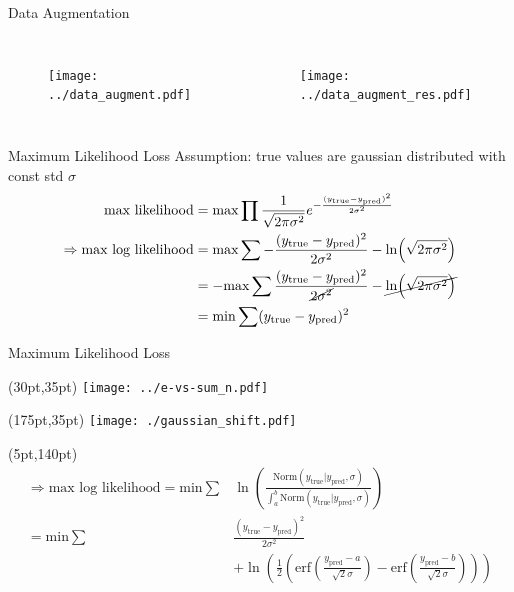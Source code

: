 \documentclass[10pt]{beamer}
\begin{document}
\begin{frame}{Data Augmentation}
  \begin{columns}
    \begin{figure}[htp]
      \texttt{[image: ../data\_augment.pdf]}
    \end{figure}
    \begin{figure}[htp]
      \texttt{[image: ../data\_augment\_res.pdf]}
    \end{figure}
  \end{columns}
\end{frame}

\begin{frame}{Maximum Likelihood Loss}
Assumption: true values are gaussian distributed with const std $\sigma$
  \begin{align*}
    \text{max likelihood} &= \text{max} \prod \frac{1}{\sqrt{2\pi \sigma^2}} e^{-\frac{(y_{\text{true}}-y_{\text{pred}})^2}{2 \sigma^2}}                          \\
    \Rightarrow \text{max log likelihood} & =\text{max} \sum -\frac{(y_{\text{true}}-y_{\text{pred}})^2}{2 \sigma^2} - \ln(\sqrt{2\pi \sigma^2})                  \\
                                          & =-\text{max} \sum\frac{(y_{\text{true}}-y_{\text{pred}})^2}{\cancel{2 \sigma^2}} - \cancel{\ln(\sqrt{2\pi \sigma^2})} \\
                                          & = \text{min} \sum (y_{\text{true}}-y_{\text{pred}})^2
  \end{align*}
\end{frame}

\begin{frame}{Maximum Likelihood Loss}
  \begin{textblock*}{150pt}(30pt,35pt)
      \texttt{[image: ../e-vs-sum\_n.pdf]}
  \end{textblock*}
  \begin{textblock*}{150pt}(175pt,35pt)
    \texttt{[image: ./gaussian\_shift.pdf]}
  \end{textblock*}

  \begin{textblock*}{150pt}(5pt,140pt)
    \begin{align*}
      \Rightarrow \text{max log likelihood} = \text{min} \sum& \ln(\frac{\text{Norm}(y_{\text{true}} | y_{\text{pred}}, \sigma)}{\int^b_a \text{Norm}(y_{\text{true}} | y_{\text{pred}}, \sigma)})\\
                                            =\text{min} \sum& \frac{(y_{\text{true}}-y_{\text{pred}})^2}{2 \sigma^2}\\
   &+\ln(\frac{1}{2} \left(\text{erf}(\frac{y_{\text{pred}}-a}{\sqrt{2}\sigma}) - \text{erf}(\frac{y_{\text{pred}}-b}{\sqrt{2}\sigma})\right))
    \end{align*}
  \end{textblock*}
\end{frame}
\end{document}
